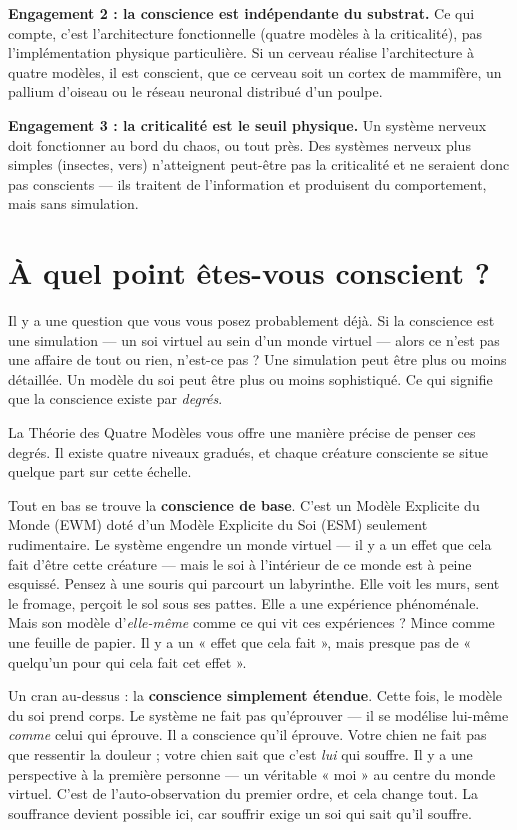 \documentclass[11pt, twoside, openright]{book}
\begin{document}
\textbf{Engagement 2 : la conscience est indépendante du substrat.} Ce qui compte, c'est l'architecture fonctionnelle (quatre modèles à la criticalité), pas l'implémentation physique particulière. Si un cerveau réalise l'architecture à quatre modèles, il est conscient, que ce cerveau soit un cortex de mammifère, un pallium d'oiseau ou le réseau neuronal distribué d'un poulpe.

\textbf{Engagement 3 : la criticalité est le seuil physique.} Un système nerveux doit fonctionner au bord du chaos, ou tout près. Des systèmes nerveux plus simples (insectes, vers) n'atteignent peut-être pas la criticalité et ne seraient donc pas conscients --- ils traitent de l'information et produisent du comportement, mais sans simulation.

\section*{À quel point êtes-vous conscient ?}

Il y a une question que vous vous posez probablement déjà. Si la conscience est une simulation --- un soi virtuel au sein d'un monde virtuel --- alors ce n'est pas une affaire de tout ou rien, n'est-ce pas ? Une simulation peut être plus ou moins détaillée. Un modèle du soi peut être plus ou moins sophistiqué. Ce qui signifie que la conscience existe par \textit{degrés}.

La Théorie des Quatre Modèles vous offre une manière précise de penser ces degrés. Il existe quatre niveaux gradués, et chaque créature consciente se situe quelque part sur cette échelle.

Tout en bas se trouve la \textbf{conscience de base}. C'est un Modèle Explicite du Monde (EWM) doté d'un Modèle Explicite du Soi (ESM) seulement rudimentaire. Le système engendre un monde virtuel --- il y a un effet que cela fait d'être cette créature --- mais le soi à l'intérieur de ce monde est à peine esquissé. Pensez à une souris qui parcourt un labyrinthe. Elle voit les murs, sent le fromage, perçoit le sol sous ses pattes. Elle a une expérience phénoménale. Mais son modèle d'\textit{elle-même} comme ce qui vit ces expériences ? Mince comme une feuille de papier. Il y a un « effet que cela fait », mais presque pas de « quelqu'un pour qui cela fait cet effet ».

Un cran au-dessus : la \textbf{conscience simplement étendue}. Cette fois, le modèle du soi prend corps. Le système ne fait pas qu'éprouver --- il se modélise lui-même \textit{comme} celui qui éprouve. Il a conscience qu'il éprouve. Votre chien ne fait pas que ressentir la douleur ; votre chien sait que c'est \textit{lui} qui souffre. Il y a une perspective à la première personne --- un véritable « moi » au centre du monde virtuel. C'est de l'auto-observation du premier ordre, et cela change tout. La souffrance devient possible ici, car souffrir exige un soi qui sait qu'il souffre.
\end{document}
